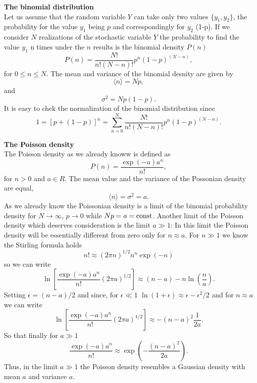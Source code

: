 {\bf The binomial distribution} \\
Let us assume that the random variable $Y$ 
can take only two values $\{y_1,y_2\}$, the probability for the 
value $y_1$ being $p$ and correspondingly for $y_2$ (1-p). If we 
consider $N$ realizations of the stochastic variable $Y$ the 
probability to find the value $y_1$ n times under the $n$ results
is the binomial density $P(n)$
\begin{equation}
P(n) = \frac{N!}{n!(N-n)!} p^n(1-p)^{(N-n)},
\end{equation}
for $0 \le n \le N$.
The mean and variance of the binomial desnity are given by
\begin{equation}
\langle n \rangle = Np,
\end{equation}
and
\begin{equation}
\sigma^2 = Np(1-p).
\end{equation}
It is easy to chek the normalization of the binomial distribution since
\begin{equation}
1 = [p + (1-p)]^n = \sum_{n=0}^N \frac{N!}{n! (N-n)!}
        p^n (1-p)^{(N-n)}.
\end{equation}

{\bf The Poisson density} \\
The Poisson density as we already knoww
is defined as
\begin{equation}
P(n) = \frac{\exp(-a) a^n}{n!},
\end{equation}
for $n > 0$ and $a \in R$. The mean value and the variance
of the Possonian density are equal,
\begin{equation}
\langle n \rangle = \sigma^2 = a.
\end{equation}
As we already know the Poissonian density is a limit of the 
binomial probability density for $N \rightarrow \infty$, $p \rightarrow 
0$ while $Np=a={\rm const}$. Another limit of the Poisson density
which deserves consideration is the limit $a \gg 1$: In this limit
the Poisson density will be essentially different from zero only 
for $n \approx a$. For $n \gg 1$ we know the Stirling formula 
holds
\begin{equation}
n! \approx (2 \pi n)^{1/2} n^n \exp(-n)
\end{equation}
so we can write
\begin{equation}
\ln\left[ \frac{\exp(-a) a^n}{n!} (2\pi a)^{1/2} \right] 
\approx (n-a) -n\ln\left(\frac{n}{a}\right).
\end{equation}
Setting $\epsilon=(n-a)/2$ and since, 
for $\epsilon \ll 1$ $\ln(1+\epsilon) \approx \epsilon -
\epsilon^2/2$ and for $n\approx a$
we can write
\begin{equation}
\ln\left[ \frac{\exp(-a) a^n}{n!} (2\pi a)^{1/2} \right] \approx
-(n-a)^2\frac{1}{2a}.
\end{equation}
So that finally for $a \gg 1$
\begin{equation}
\frac{\exp(-a) a^n}{n!} \approx \exp\left( - 
\frac{(n-a)^2}{2a}\right).
\end{equation}
Thus, in the limit $a \gg 1$ the Poisson density resembles a
Gaussian density with mean $a$ and variance $a$.

